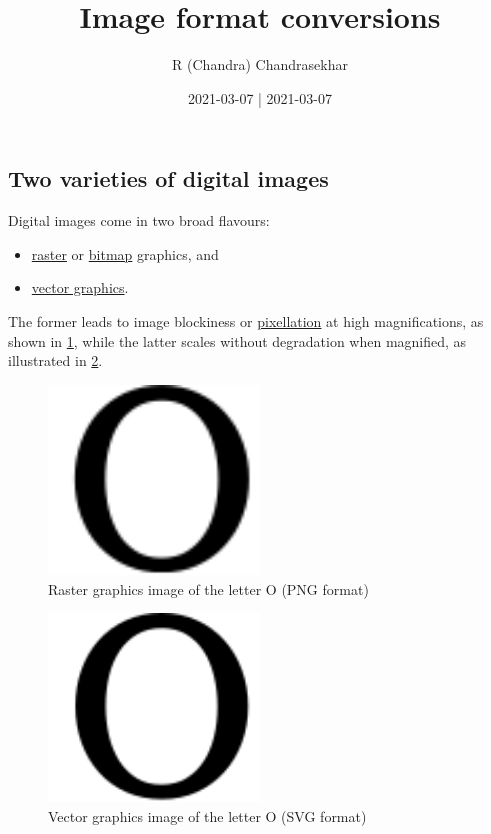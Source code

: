 \documentclass[
  11pt,
  british,
  a4paper,
]{article}
\title{Image format conversions}
\author{R (Chandra) Chandrasekhar}
\date{2021-03-07 | 2021-03-07}
\providecommand{\tightlist}{%
  \setlength{\itemsep}{0pt}\setlength{\parskip}{0pt}}
\begin{document}
\maketitle

\thispagestyle{empty}


\hypertarget{two-varieties-of-digital-images}{%
\subsection{Two varieties of digital
images}\label{two-varieties-of-digital-images}}

Digital images come in two broad flavours:

\begin{itemize}
\tightlist
\item
  \href{https://en.wikipedia.org/wiki/Raster_graphics}{raster} or
  \href{https://en.wikipedia.org/wiki/Bitmap}{bitmap} graphics, and
\item
  \href{https://en.wikipedia.org/wiki/Vector_graphics}{vector graphics}.
\end{itemize}

The former leads to image blockiness or
\href{https://en.wikipedia.org/wiki/Pixelation}{pixellation} at high
magnifications, as shown in \cref{fig:raster}, while the latter scales
without degradation when magnified, as illustrated in \cref{fig:vector}.

\begin{figure}
\hypertarget{fig:raster}{%
\centering
\includegraphics[width=0.5\textwidth,height=\textheight]{images/raster.png}
\caption{Raster graphics image of the letter O (PNG
format)}\label{fig:raster}
}
\end{figure}

\begin{figure}
\hypertarget{fig:vector}{%
\centering
\includegraphics[width=0.5\textwidth,height=\textheight]{images/vector.svg}
\caption{Vector graphics image of the letter O (SVG
format)}\label{fig:vector}
}
\end{figure}
\end{document}
